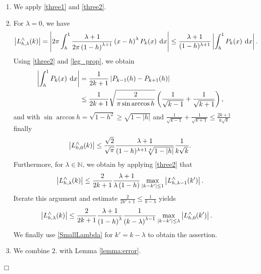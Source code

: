 \documentclass[11pt,a4paper,twoside,bibtotoc]{scrartcl}
\theoremstyle{plain}
\theoremstyle{definition}
\theoremstyle{remark}
\newenvironment{proof}{{\bf Proof.}}{$\Box$}
\newcommand{\N}{\ensuremath{\mathbb{N}}}
\newcommand{\abs}[1]{\ensuremath{\left\vert#1\right\vert}}
\newcommand{\fun}[2]{\ensuremath{#1{\hspace{-0.4ex}}\left(#2\right)}}
\newcommand{\paren}[1]{\ensuremath{\left(#1\right)}}
\newcommand{\dx}{\text{\rm{d}}}
\numberwithin{equation}{section}
\numberwithin{table}{section}
\numberwithin{figure}{section}
\begin{document}
\begin{proof}
  \begin{enumerate}
  \item We apply \eqref{three1} and \eqref{three2}.
  \item For $\lambda=0$, we have
    \begin{equation*}
      \left|\fun{L_{h,\lambda}^{\wedge}}{k}\right| 
      = \abs{2\pi \int_{h}^1 \frac{\lambda+1}{2\pi\paren{1-h}^{\lambda+1}} 
        \paren{x-h}^{\lambda} \fun{P_{k}}{x} \: \dx x} 
      \le \frac{\lambda+1}{(1-h)^{\lambda+1}}\abs{\int_{h}^1 \fun{P_{k}}{x} \: \dx x}.
    \end{equation*}
    Using \eqref{three2} and \eqref{leg_prop}, we obtain
    \begin{align*}
      \abs{\int_{h}^1 \fun{P_{k}}{x} \: \dx x}
      & = \frac{1}{2k+1}
          \abs{\fun{P_{k-1}}{h} - \fun{P_{k+1}}{h}}\\
      & \le \frac{1}{2k+1} \sqrt{\frac{2}{\pi \sin\arccos h}} \paren{\frac{1}{\sqrt{k-1}} + \frac{1}{\sqrt{k+1}}},
    \end{align*}
    and with $\sin\arccos h = \sqrt{1-h^2} \ge \sqrt{1-|h|}$ and
    $\frac{1}{\sqrt{k-1}} + \frac{1}{\sqrt{k+1}} \le
    \frac{2k+1}{k\sqrt{k}}$ finally
    \begin{equation}
      \label{SmallLambda}
      \left|\fun{L_{h,0}^{\wedge}}{k}\right| \le 
      \frac{\sqrt{2}}{\sqrt{\pi}}\frac{\lambda+1}{(1-h)^{\lambda+1}\sqrt[4]{1-|h|}}
      \frac{1}{k\sqrt{k}}.
    \end{equation}
    Furthermore, for $\lambda \in \N$, we obtain by applying \eqref{three2} that
    \begin{equation*}
      \left|\fun{L_{h,\lambda}^{\wedge}}{k}\right| 
      \le \frac{2}{2k+1} \frac{\lambda+1}{\lambda\left(1-h\right)}
      \max\limits_{|k-k'|\le 1}
      \left|\fun{L_{h,\lambda-1}^{\wedge}}{k'}\right|.
    \end{equation*}
    Iterate this argument and estimate $\frac{2}{2k'+1}\le
    \frac{1}{k-\lambda}$ yields
    \begin{align*}
      \left|\fun{L_{h,\lambda}^{\wedge}}{k}\right|
      & \le \frac{2}{2k+1} \frac{\lambda+1}{\paren{1-h}^{\lambda}}
        \frac{1}{\paren{k-\lambda}^{\lambda-1}} 
        \max_{|k-k'| \le \lambda} 
        \abs{\fun{L_{h,0}^{\wedge}}{k'}}.
    \end{align*}
    We finally use \eqref{SmallLambda} for $k'=k-\lambda$ to obtain the
    assertion.
  \item We combine 2. with Lemma \ref{lemma:error}. 
  \end{enumerate}
  \hfill
\end{proof}
\end{document}
